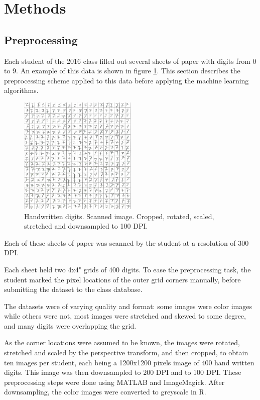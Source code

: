 \section{Methods}
\subsection{Preprocessing}
Each student of the 2016 class filled out several sheets of paper
with digits from 0 to 9. An example of this data
is shown in figure 
\ref{fig:handwriten_digits}. 
This section describes the preprocessing scheme
applied to this data before applying the machine learning algorithms.
\begin{figure}[h]
\centering
\includegraphics[width = 0.5\textwidth]{img/cropY2016G2M1-100-7.png}
\caption[Handwritten digits]
{
Handwritten digits. Scanned image. Cropped, rotated, scaled, stretched
and downsampled to 100 DPI.
}
\label{fig:handwriten_digits}
\end{figure}
Each of these sheets of paper was scanned by the student at a resolution of 300 DPI.

Each sheet held two 4x4" grids of 400 digits.
To ease the preprocessing task,
the student marked the pixel locations of the outer grid corners manually,
before submitting the dataset to the class database.

The datasets were of varying quality and format:
some images were color images while others were not,
most images were stretched and skewed to some degree,
and many digits were overlapping the grid.

As the corner locations were assumed to be known,
the images were rotated, stretched and scaled
by the perspective transform,
and then cropped,
to obtain ten images per student,
each being a 1200x1200 pixels image of 400 hand written digits.
This image was then downsampled to 200 DPI and to 100 DPI.
These preprocessing steps were done using MATLAB and ImageMagick.
After downsampling, the color images were converted to greyscale in R.

